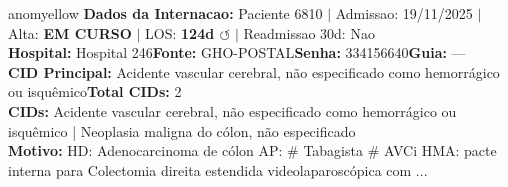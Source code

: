 \documentclass[a4paper,10pt]{article}
\begin{document}
\begin{anomalycard}[Internacao 6006 | GHO-POSTAL | MODERADO (z=2.74)]{anomyellow}
\textbf{Dados da Internacao:} Paciente 6810 $\mid$ Admissao: 19/11/2025 $\mid$ Alta: \textcolor{anomorange}{\textbf{EM CURSO}} $\mid$ LOS: \textbf{124d \textcolor{anomorange}{$\circlearrowleft$}} $\mid$ Readmissao 30d: Nao\\
\textbf{Hospital:} Hospital 246\quad\textbf{Fonte:} GHO-POSTAL\quad\textbf{Senha:} 334156640\quad\textbf{Guia:} ---\\
\textbf{CID Principal:} {\small Acidente vascular cerebral, não especificado como hemorrágico ou isquêmico}\quad\textbf{Total CIDs:} 2\\

\textbf{CIDs:} {\scriptsize Acidente vascular cerebral, não especificado como hemorrágico ou isquêmico | Neoplasia maligna do cólon, não especificado}\\

\textbf{Motivo:} {\scriptsize HD: Adenocarcinoma de cólon AP: \# Tabagista \# AVCi HMA: pacte interna para Colectomia direita estendida videolaparoscópica com ...}\\


\end{anomalycard}
\end{document}
